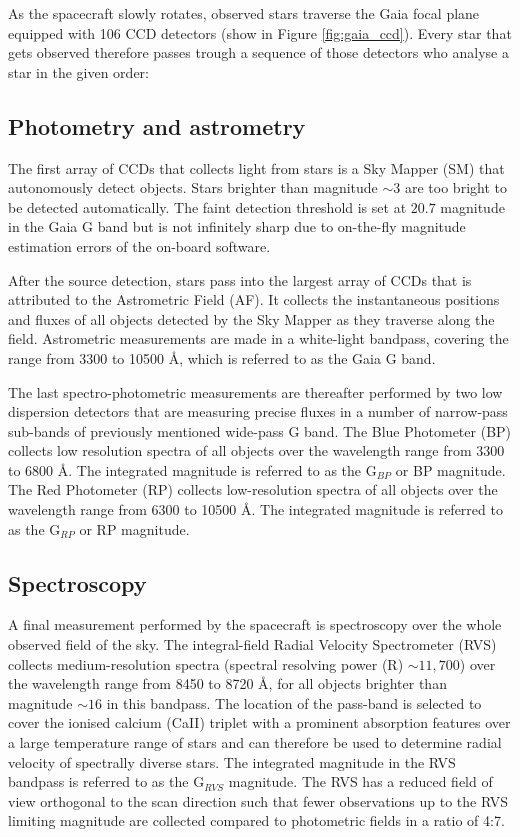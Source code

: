 As the spacecraft slowly rotates, observed stars traverse the Gaia focal plane equipped with 106 CCD detectors (show in Figure \ref{fig:gaia_ccd}). Every star that gets observed therefore passes trough a sequence of those detectors who analyse a star in the given order:

\subsection{Photometry and astrometry}
The first array of CCDs that collects light from stars is a Sky Mapper (SM) that autonomously detect objects. Stars brighter than magnitude $\sim3$ are too bright to be detected automatically. The faint detection threshold is set at $20.7$ magnitude in the Gaia G band but is not infinitely sharp due
to on-the-fly magnitude estimation errors of the on-board software.

After the source detection, stars pass into the largest array of CCDs that is attributed to the Astrometric Field (AF). It collects the instantaneous positions and fluxes of all objects detected by the Sky Mapper as they traverse along the field. Astrometric measurements are made in a white-light bandpass, covering the range from 3300 to 10500 \AA, which is referred to as the Gaia G band.

The last spectro-photometric measurements are thereafter performed by two low dispersion detectors that are measuring precise fluxes in a number of narrow-pass sub-bands of previously mentioned wide-pass G band. The Blue Photometer (BP) collects low resolution spectra of all objects over the wavelength range from 3300 to 6800 \AA. The integrated magnitude is referred to as the G$_{BP}$ or BP magnitude. The Red Photometer (RP) collects low-resolution spectra of all objects over the wavelength range from 6300 to 10500 \AA. The integrated magnitude is referred to as the G$_{RP}$ or RP magnitude.

\subsection{Spectroscopy}
A final measurement performed by the spacecraft is spectroscopy over the whole observed field of the sky. The integral-field Radial Velocity Spectrometer (RVS) \citep{2018A&A...616A...5C} collects medium-resolution spectra (spectral resolving power (R) $\sim11,700$) over the wavelength range from 8450 to 8720 \AA, for all objects brighter than magnitude $\sim16$ in this bandpass. The location of the pass-band is selected to cover the ionised calcium (CaII) triplet with a prominent absorption features over a large temperature range of stars and can therefore be used to determine radial velocity of spectrally diverse stars. The integrated magnitude in the RVS bandpass is referred to as the G$_{RVS}$ magnitude. The RVS has a reduced field of view orthogonal to the scan direction such that fewer observations up to the RVS limiting magnitude are collected compared to photometric fields in a ratio of 4:7.

